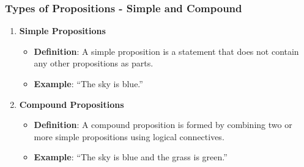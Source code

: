 \documentclass[aspectratio=169]{beamer}
\begin{document}
\begin{frame}[fragile]
    \frametitle{Types of Propositions - Simple and Compound}
    \begin{enumerate}
        \item \textbf{Simple Propositions}
            \begin{itemize}
                \item \textbf{Definition}: A simple proposition is a statement that does not contain any other propositions as parts.
                \item \textbf{Example}: ``The sky is blue.''
            \end{itemize}
        
        \item \textbf{Compound Propositions}
            \begin{itemize}
                \item \textbf{Definition}: A compound proposition is formed by combining two or more simple propositions using logical connectives.
                \item \textbf{Example}: ``The sky is blue and the grass is green.''
            \end{itemize}
    \end{enumerate}
\end{frame}
\end{document}
